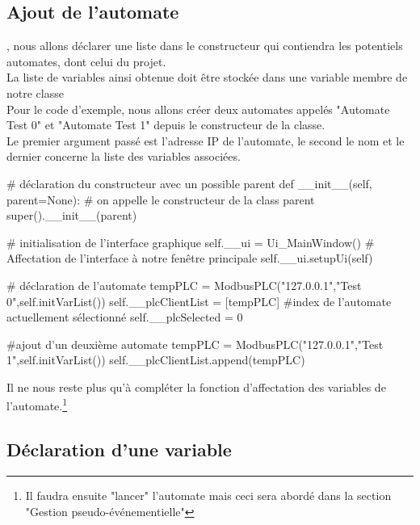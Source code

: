 \subsection{Ajout de l'automate}

, nous allons déclarer une liste dans le constructeur qui contiendra les potentiels automates, dont celui du projet. \\
La liste de variables ainsi obtenue doit être stockée dans une variable membre de notre classe \\
Pour le code d'exemple, nous allons créer deux automates appelés "Automate Test 0" et "Automate Test 1" depuis le constructeur de la classe.\\

Le premier argument passé est l'adresse IP de l'automate, le second le nom et le dernier concerne la liste des variables associées.

\begin{Python}

	# déclaration du constructeur avec un possible parent
	def __init__(self, parent=None):
		# on appelle le constructeur de la class parent
		super().__init__(parent)

		# initialisation de l’interface graphique
		self.__ui = Ui_MainWindow()
		# Affectation de l’interface à notre fenêtre principale
		self.__ui.setupUi(self)

		# déclaration de l’automate
		tempPLC = ModbusPLC("127.0.0.1","Test 0",self.initVarList())
		self.__plcClientList = [tempPLC]
		#index de l'automate actuellement sélectionné
		self.__plcSelected = 0

		#ajout d'un deuxième automate
		tempPLC = ModbusPLC("127.0.0.1","Test 1",self.initVarList())
		self.__plcClientList.append(tempPLC)
\end{Python}

Il ne nous reste plus qu'à compléter la fonction d'affectation des variables de l'automate.\footnote{ Il faudra ensuite "lancer" l'automate mais ceci sera abordé dans la section "Gestion pseudo-événementielle"}


\subsection{Déclaration d'une variable}

